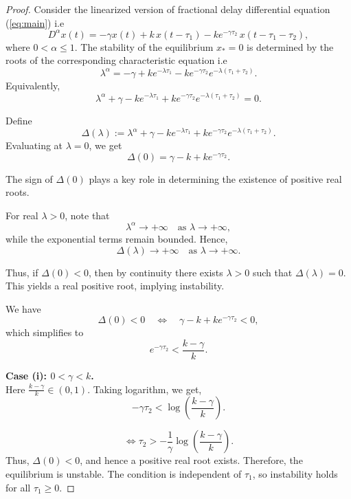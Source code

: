 \documentclass[11pt]{article}
\theoremstyle{remark}
\begin{document}
\begin{proof}
	Consider the linearized version of  fractional delay differential equation (\ref{eq:main}) i.e 
	\begin{equation}
		D^{\alpha} x(t)
		= -\gamma x(t)
		+ k\,x(t - \tau_1)
		- k e^{-\gamma \tau_2}\, x(t - \tau_1 - \tau_2),
	\end{equation}
	where $0<\alpha\le 1$. The stability of the equilibrium $x_*=0$ is determined by the roots of the corresponding characteristic equation i.e
	\[
	\lambda^{\alpha}
	= -\gamma + k e^{-\lambda \tau_1}
	- k e^{-\gamma \tau_2} e^{-\lambda(\tau_1+\tau_2)}.
	\]
	Equivalently,
	\begin{equation}
		\lambda^{\alpha} + \gamma
		- k e^{-\lambda \tau_1}
		+ k e^{-\gamma \tau_2} e^{-\lambda(\tau_1+\tau_2)}=0.
		\label{char}
	\end{equation}
	
	\medskip

	Define
	\[
	\Delta(\lambda)
	:= \lambda^{\alpha} + \gamma
	- k e^{-\lambda \tau_1}
	+ k e^{-\gamma \tau_2} e^{-\lambda(\tau_1+\tau_2)}.
	\]
	Evaluating at $\lambda=0$, we get
	\[
	\Delta(0)
	= \gamma - k + k e^{-\gamma \tau_2}.
	\]
	
	The sign of $\Delta(0)$ plays a key role in determining the existence of positive real roots.
	
	\medskip

	
	For real $\lambda>0$, note that
	\[
	\lambda^{\alpha} \to +\infty \quad \text{as } \lambda \to +\infty,
	\]
	while the exponential terms remain bounded. Hence,
	\[
	\Delta(\lambda)\to +\infty \quad \text{as } \lambda\to+\infty.
	\]
	
	Thus, if $\Delta(0)<0$, then by continuity there exists $\lambda>0$ such that $\Delta(\lambda)=0$. This yields a real positive root, implying instability.
	
	\medskip
	\noindent

	
	We have
	\[
	\Delta(0)<0
	\quad \Longleftrightarrow \quad
	\gamma - k + k e^{-\gamma \tau_2} < 0,
	\]
	which simplifies to
	\[
	e^{-\gamma \tau_2} < \frac{k-\gamma}{k}.
	\]
	
	\medskip
	\noindent
	\textbf{Case (i): $0<\gamma<k$.}\\

	Here $\frac{k-\gamma}{k}\in(0,1)$. Taking logarithm, we get,
	\[
	-\gamma \tau_2 < \log\left(\frac{k-\gamma}{k}\right).
	\]
	
	\[
\Leftrightarrow	\tau_2 > -\frac{1}{\gamma}\log\left(\frac{k-\gamma}{k}\right).
	\]
	Thus, $\Delta(0)<0$, and hence a positive real root exists. Therefore, the equilibrium is unstable. The condition is independent of $\tau_1$, so instability holds for all $\tau_1\ge 0$.
	

\end{proof}
\end{document}
